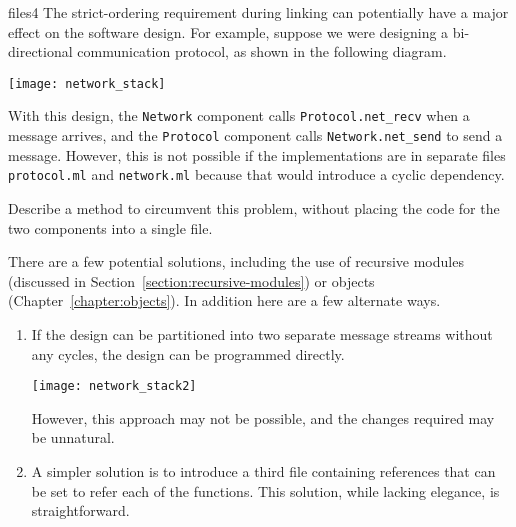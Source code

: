 %
\begin{exercise}{files4}
The strict-ordering requirement during linking can potentially have a
major effect on the software design.  For example, suppose we were
designing a bi-directional communication protocol, as shown in the
following diagram.

\begin{center}
\texttt{[image: network\_stack]}
\end{center}
%
With this design, the \hbox{\lstinline+Network+} component
calls \hbox{\lstinline+Protocol.net_recv+} when a message arrives, and
the \hbox{\lstinline+Protocol+} component
calls \hbox{\lstinline+Network.net_send+} to send a message.  However,
this is not possible if the implementations are in separate
files \hbox{\lstinline+protocol.ml+} and \hbox{\lstinline+network.ml+}
because that would introduce a cyclic dependency.

Describe a method to circumvent this problem, without placing the code
for the two components into a single file.

\begin{answer}\ifanswers
There are a few potential solutions, including the use of recursive
modules (discussed in Section~\ref{section:recursive-modules}) or
objects (Chapter~\ref{chapter:objects}).  In addition here are a few
alternate ways.

\begin{enumerate}
\item

If the design can be partitioned into two separate message streams
without any cycles, the design can be programmed directly.

\begin{center}
\texttt{[image: network\_stack2]}
\end{center}
%
However, this approach may not be possible, and the changes required
may be unnatural.

\item

A simpler solution is to introduce a third file containing references
that can be set to refer each of the functions.  This solution, while
lacking elegance, is straightforward.


\end{enumerate}
\end{answer}
\end{exercise}
